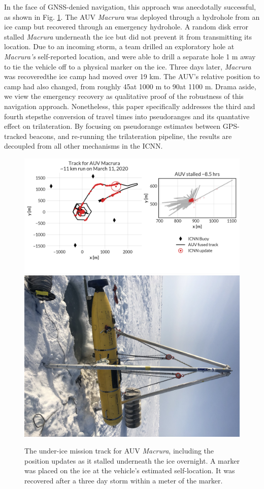 In the face of GNSS-denied navigation, this approach was anecdotally successful, as shown in Fig. \ref{fig:vehicleRecovery}.
The AUV \emph{Macrura} was deployed through a hydrohole from an ice camp but recovered through an emergency hydrohole.
A random disk error stalled \emph{Macrura} underneath the ice but did not prevent it from transmitting its location.
Due to an incoming storm, a team drilled an exploratory hole at \emph{Macrura's} self-reported location, and were able to drill a separate hole 1 m away to tie the vehicle off to a physical marker on the ice.
Three days later, \emph{Macrura} was recovered\textemdash the ice camp had moved over 19 km.
The AUV's relative position to camp had also changed, from roughly 45\textdegree at 1000 m to 90\textdegree at 1100 m.
Drama aside, we view the emergency recovery as qualitative proof of the robustness of this navigation approach.
Nonetheless, this paper specifically addresses the third and fourth steps\textemdash the conversion of travel times into pseudoranges and its quantative effect on trilateration.
By focusing on pseudorange estimates between GPS-tracked beacons, and re-running the trilateration pipeline, the results are decoupled from all other mechanisms in the ICNN.

\begin{figure}[h!]
	\centering
	\includegraphics[width=0.7\columnwidth]{figs/auv-track-update.png} \hfill
	\includegraphics[width=0.28\columnwidth]{figs/Fig1.jpg}
	\caption{The under-ice mission track for AUV \emph{Macrura}, including the position updates as it stalled underneath the ice overnight. A marker was placed on the ice at the vehicle's estimated self-location. It was recovered after a three day storm within a meter of the marker.}
	\label{fig:vehicleRecovery}
\end{figure}

